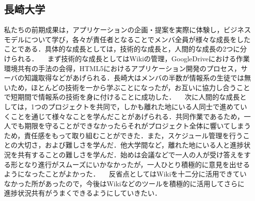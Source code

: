 \subsection{長崎大学}
\par
私たちの前期成果は，アプリケーションの企画・提案を実際に体験し，ビジネスモデルについて学び，各々が責任者となることでメンバ全員が様々な成長をしたことである．具体的な成長としては，技術的な成長と，人間的な成長の2つに分けられる．
　まず技術的な成長としてはWikiの管理，GoogleDriveにおける作業環境共有の手法の会得，HTML5におけるアプリケーション開発のプロセス，サーバの知識取得などがあげられる．長崎大はメンバの半数が情報系の生徒では無いため，ほとんどの技術を一から学ぶことになったが，お互いに協力し合うことで短期間で情報系の技術を身に付けることに成功した．
　次に人間的な成長としては，1つのプロジェクトを共同で，しかも離れた地にいる人同士で進めていくことを通じて様々なことを学んだことがあげられる．共同作業であるため，一人でも期限を守ることができなかったらそれがプロジェクト全体に響いてしまうため，責任感をもって取り組むことができた．また，スケジュール管理を行うことの大切さ，および難しさを学んだ．他大学間など，離れた地にいる人と進捗状況を共有することの難しさを学んだ．始めは会議などで一人の人が受け答えをする形となり進行がスムーズにいかなかったが，一人ひとり積極的に意見を出せるようになったことがよかった．
　反省点としてはWikiを十二分に活用できていなかった所があったので，今後はWikiなどのツールを積極的に活用してさらに進捗状況共有がうまくできるようにしていきたい．

